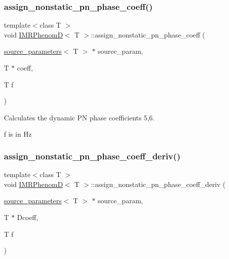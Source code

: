 \subsubsection{\texorpdfstring{assign\+\_\+nonstatic\+\_\+pn\+\_\+phase\+\_\+coeff()}{assign\_nonstatic\_pn\_phase\_coeff()}}
{\footnotesize\ttfamily template$<$class T $>$ \\
void \hyperlink{classIMRPhenomD}{I\+M\+R\+PhenomD}$<$ T $>$\+::assign\+\_\+nonstatic\+\_\+pn\+\_\+phase\+\_\+coeff (\begin{DoxyParamCaption}\item[{\hyperlink{structsource__parameters}{source\+\_\+parameters}$<$ T $>$ $\ast$}]{source\+\_\+param,  }\item[{T $\ast$}]{coeff,  }\item[{T}]{f }\end{DoxyParamCaption})\hspace{0.3cm}{\ttfamily [virtual]}}



Calculates the dynamic PN phase coefficients 5,6. 

f is in Hz \mbox{\label{classIMRPhenomD_aa10c5932742768573488dbdfa8526bff}} 
\subsubsection{\texorpdfstring{assign\+\_\+nonstatic\+\_\+pn\+\_\+phase\+\_\+coeff\+\_\+deriv()}{assign\_nonstatic\_pn\_phase\_coeff\_deriv()}}
{\footnotesize\ttfamily template$<$class T $>$ \\
void \hyperlink{classIMRPhenomD}{I\+M\+R\+PhenomD}$<$ T $>$\+::assign\+\_\+nonstatic\+\_\+pn\+\_\+phase\+\_\+coeff\+\_\+deriv (\begin{DoxyParamCaption}\item[{\hyperlink{structsource__parameters}{source\+\_\+parameters}$<$ T $>$ $\ast$}]{source\+\_\+param,  }\item[{T $\ast$}]{Dcoeff,  }\item[{T}]{f }\end{DoxyParamCaption})\hspace{0.3cm}{\ttfamily [virtual]}}



